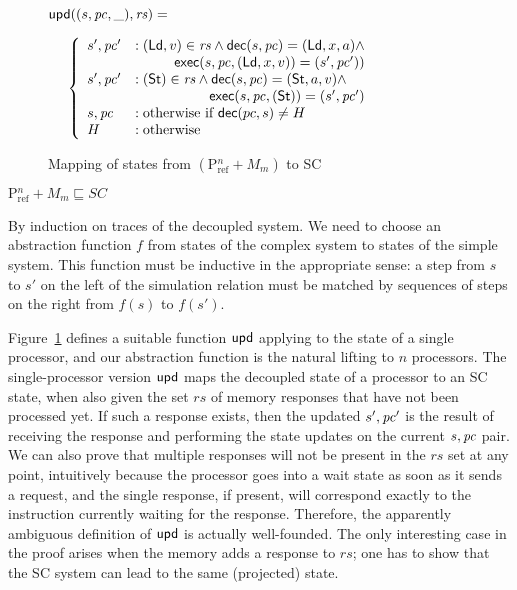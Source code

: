 \begin{figure}[h]
\begin{boxedminipage}{\columnwidth}
\small
$\mathsf{upd}((s, \mathit{pc}, \_), \mathit{rs}) =$

\begin{math}
\;\;\;\;\;\left\{
\begin{array}{ll}
s', \pc' &: (\ld, v) \in \mathit{rs} \wedge \dec(s, \pc) = (\ld, x, a) \wedge\\
\multicolumn{2}{r}{\exec(s, \pc, (\ld, x, v)) = (s',\pc'))}\\
s', \pc' &: (\st) \in \mathit{rs} \wedge \dec(s, \pc) = (\st, a, v) \wedge\\
\multicolumn{2}{r}{\exec(s, \pc, (\st)) = (s',\pc')}\\
s, \pc &: \text{otherwise if } \dec(pc,s) \neq H\\
H &: \text{otherwise}
\end{array}
\right.
\end{math}
\end{boxedminipage}
\caption{Mapping of states from $(\text{P$^n_\text{ref}$} + M_m)$ to SC}
\label{smap}
\end{figure}

\begin{theorem}
$\text{P$^n_{\text{ref}}$} + M_m \sqsubseteq SC$\label{scthm}
\end{theorem}
\begin{prf}
By induction on traces of the decoupled system.  We need to choose an
abstraction function $f$ from states of the complex system to states of
the simple system.  This function must be inductive in the
appropriate sense: a step from $s$ to $s'$ on the left of the
simulation relation must be matched by sequences of steps on the right
from $f(s)$ to $f(s')$.

Figure~\ref{smap} defines a suitable function $\mathsf{upd}$ applying to the
state of a single processor, and our abstraction function is the
natural lifting to $n$ processors.
The single-processor version $\mathsf{upd}$ maps
the decoupled state of a processor to an SC state, when also given the
set $rs$ of memory responses that have not been processed yet. If such a
response exists, then the updated $s', \mathit{pc}'$ is the result of
receiving the response and performing the state updates on the current $s,
\mathit{pc}$ pair.  We can also prove that multiple responses will not be present in
the $rs$ set at any point, intuitively because the processor goes into a wait
state as soon as it sends a request, and the single response, if present, will
correspond exactly to the instruction currently waiting for the response.
Therefore, the apparently ambiguous definition of $\mathsf{upd}$ is actually
well-founded.  The only interesting case in the proof arises when the memory adds a
response to $rs$; one has to show that the SC system can lead to the same
(projected) state.
\end{prf}

